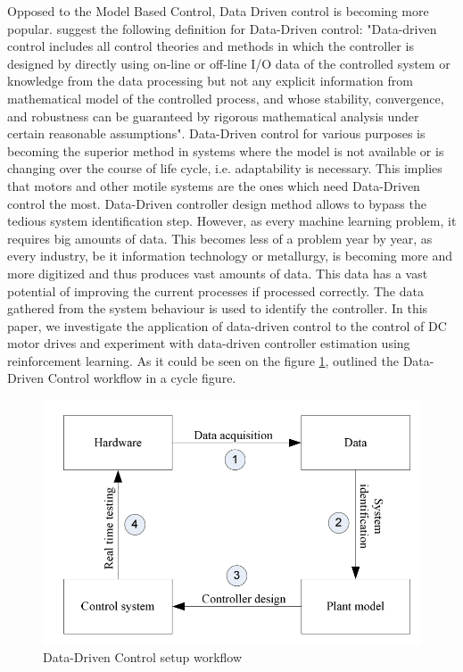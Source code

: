 \documentclass[]{final_report}
\begin{document}
Opposed to the Model Based Control, Data Driven control is becoming more popular. \cite{hou2013model} suggest the following definition for Data-Driven control: "Data-driven control includes all control theories and methods in which the controller is designed by directly using on-line or off-line I/O data of the controlled system or knowledge from the data processing but not any explicit information from mathematical model of the controlled process, and whose stability, convergence, and robustness can be guaranteed by rigorous mathematical analysis under certain reasonable assumptions". Data-Driven control for various purposes is becoming the superior method in systems where the model is not available or is changing over the course of life cycle, i.e. adaptability is necessary. This implies that motors and other motile systems are the ones which need Data-Driven control the most. Data-Driven controller design method allows to bypass the tedious system identification step. However, as every machine learning problem, it requires big amounts of data. This becomes less of a problem year by year, as every industry, be it information technology or metallurgy, is becoming more and more digitized and thus produces vast amounts of data. This data has a vast potential of improving the current processes if processed correctly. The data gathered from the system behaviour is used to identify the controller. In this paper, we investigate the application of data-driven control to the control of DC motor drives and experiment with data-driven controller estimation using reinforcement learning. As it could be seen on the figure \ref{fig:ddcwork}, \cite{naung2018a} outlined the Data-Driven Control workflow in a cycle figure.

\begin{figure} [h!]
\centerline{\includegraphics[width=.5\textwidth]{Screenshots for related work/ddc process.png}}
\caption{Data-Driven Control setup workflow \cite{naung2018a}}
\label{fig:ddcwork}
\end{figure}
\end{document}

